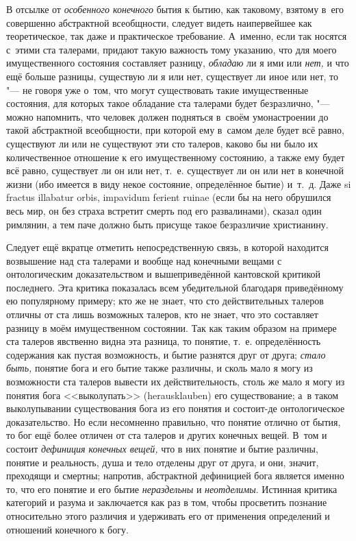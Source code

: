 В отсылке от {\em особенного конечного} бытия к бытию, как таковому, взятому
в~его совершенно абстрактной всеобщности, следует видеть наипервейшее как
теоретическое, так даже и практическое требование. А~именно, если так носятся
с~этими ста талерами, придают такую важность тому указанию, что для моего
имущественного состояния составляет разницу, {\em обладаю} ли я ими или
{\em нет,} и что ещё больше разницы, существую ли я или нет, существует ли иное
или нет, то "--- не говоря уже о~том, что могут существовать такие
имущественные состояния, для которых такое обладание ста талерами будет
безразлично, "--- можно напомнить, что человек должен подняться в~своём
умонастроении до такой абстрактной всеобщности, при которой ему в~самом деле
будет всё равно, существуют ли или не существуют эти сто талеров, каково бы ни
было их количественное отношение к его имущественному состоянию, а также ему
будет всё равно, существует ли он или нет, т.~е. существует ли он или нет в
конечной жизни (ибо имеется в виду некое состояние, определённое бытие) и~т.~д.
Даже si fractus illabatur orbis, impavidum ferient ruinae (если бы на него
обрушился весь мир, он без страха встретит смерть под его развалинами), сказал
один римлянин, а тем паче должно быть присуще такое безразличие христианину.

Следует ещё вкратце отметить непосредственную связь, в которой находится
возвышение над ста талерами и вообще над конечными вещами с онтологическим
доказательством и вышеприведённой кантовской критикой последнего. Эта критика
показалась всем убедительной благодаря приведённому ею популярному примеру; кто
же не знает, что сто действительных талеров отличны от ста лишь возможных
талеров, кто не знает, что это составляет разницу в моём имущественном
состоянии. Так как таким образом на примере ста талеров явственно видна эта
разница, то понятие, т.~е. определённость содержания как пустая возможность, и
бытие разнятся друг от друга; {\em стало быть,} понятие бога и его бытие также
различны, и сколь мало я могу из возможности ста талеров вывести их
действительность, столь же мало я могу из понятия бога <<выколупать>>
(heraus\-klau\-ben) его существование; а~в таком выколупывании существования
бога из его понятия и состоит-де онтологическое доказательство. Но если
несомненно правильно, что понятие отлично от бытия, то бог ещё более
отличен от ста талеров и других конечных вещей. В~том и состоит
{\em дефиниция конечных вещей,} что в них понятие и бытие различны, понятие
и реальность, душа и тело отделены друг от друга, и они, значит, преходящи
и смертны; напротив, абстрактной дефиницией бога является именно то, что его
понятие и его бытие {\em нераздельны} и {\em неотделимы}. Истинная критика
категорий и разума и заключается как раз в том, чтобы просветить познание
относительно этого различия и удерживать его от применения определений и
отношений конечного к богу.\label{bkm:bm85b}

